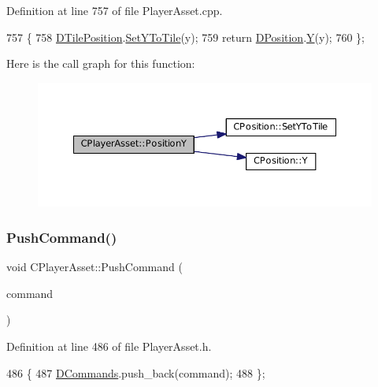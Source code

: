Definition at line 757 of file Player\+Asset.\+cpp.


\begin{DoxyCode}
757                                 \{
758     \hyperlink{classCPlayerAsset_a5b59a9d3b7db8c7fa194b80dafb96186}{DTilePosition}.\hyperlink{classCPosition_a5805485f623398197ac595a5d389f691}{SetYToTile}(y);
759     \textcolor{keywordflow}{return} \hyperlink{classCPlayerAsset_aa9f53c009b181c7c5647c6b03776a04c}{DPosition}.\hyperlink{classCPosition_a1aa8a30e2f08dda1f797736ba8c13a87}{Y}(y);
760 \};
\end{DoxyCode}
Here is the call graph for this function\+:\nopagebreak
\begin{figure}[H]
\begin{center}
\leavevmode
\includegraphics[width=350pt]{classCPlayerAsset_a497fe719ca97252f0ee7985e0e30518e_cgraph}
\end{center}
\end{figure}
\hypertarget{classCPlayerAsset_ab7421ec7906d36f028484ff518cc3c90}{}\label{classCPlayerAsset_ab7421ec7906d36f028484ff518cc3c90} 
\subsubsection{\texorpdfstring{Push\+Command()}{PushCommand()}}
{\footnotesize\ttfamily void C\+Player\+Asset\+::\+Push\+Command (\begin{DoxyParamCaption}\item[{const \hyperlink{structSAssetCommand}{S\+Asset\+Command} \&}]{command }\end{DoxyParamCaption})\hspace{0.3cm}{\ttfamily [inline]}}



Definition at line 486 of file Player\+Asset.\+h.


\begin{DoxyCode}
486                                                       \{
487             \hyperlink{classCPlayerAsset_a4d3b96106d3b1c1020f98005884d2a87}{DCommands}.push\_back(command);
488         \};
\end{DoxyCode}
\hypertarget{classCPlayerAsset_a717695212dd7159bd0b6e97d4ae5cf9b}{}\label{classCPlayerAsset_a717695212dd7159bd0b6e97d4ae5cf9b} 
